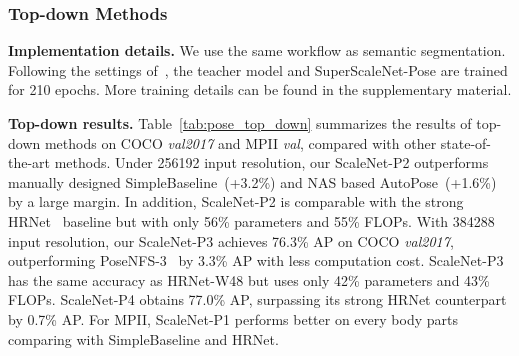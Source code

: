 \documentclass[final]{cvpr}
\newcommand{\netname}{ScaleNet\xspace}
\newcommand{\supernet}{SuperScaleNet\xspace}
\begin{document}
\subsubsection{Top-down Methods}

\noindent\textbf{Implementation details.} We use the same workflow as semantic segmentation. Following the settings of~\cite{sun2019deep, wang2020deep}, the teacher model and \supernet-Pose are trained for 210 epochs. More training details can be found in the supplementary material.

\noindent\textbf{Top-down results.} Table~\ref{tab:pose_top_down} summarizes the results of top-down methods on COCO \textit{val2017} and MPII \textit{val}, compared with other state-of-the-art methods. Under 256192 input resolution, our \netname-P2 outperforms manually designed SimpleBaseline~\cite{xiao2018simple}(+3.2\%) and NAS based AutoPose~\cite{gong2020autopose}(+1.6\%) by a large margin. In addition, \netname-P2 is comparable with the strong HRNet~\cite{wang2020deep} baseline but with only 56\% parameters and 55\% FLOPs. With 384288 input resolution, our \netname-P3 achieves 76.3\% AP on COCO \textit{val2017}, outperforming PoseNFS-3~\cite{yang2019pose} by 3.3\% AP with less computation cost. \netname-P3 has the same accuracy as HRNet-W48 but uses only 42\% parameters and 43\% FLOPs. \netname-P4 obtains 77.0\% AP, surpassing its strong HRNet counterpart by 0.7\% AP. For MPII, \netname-P1 performs better on every body parts comparing with SimpleBaseline and HRNet.
\end{document}
